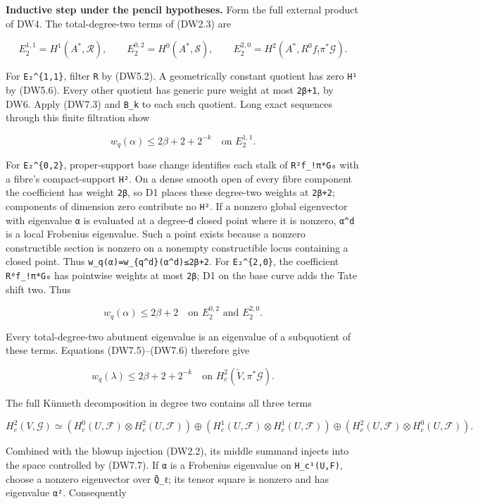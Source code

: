 \documentclass[
]{report}
\newcounter{none} %
\begin{document}
\textbf{Inductive step under the pencil hypotheses.} Form the full
external product of DW4. The total-degree-two terms of (DW2.3) are

\[
E_2^{1,1}=H^1(A^*,\mathcal R),\qquad
E_2^{0,2}=H^0(A^*,\mathcal S),\qquad
E_2^{2,0}=H^2(A^*,R^0f_!\pi^*\mathcal G).
\tag{DW7.4}
\]

For \texttt{E₂\^{}\{1,1\}}, filter \texttt{R} by (DW5.2). A
geometrically constant quotient has zero \texttt{H¹} by (DW5.6). Every
other quotient has generic pure weight at most \texttt{2β+1}, by DW6.
Apply (DW7.3) and \texttt{B\_k} to each such quotient. Long exact
sequences through this finite filtration show

\[
w_q(\alpha)\le2\beta+2+2^{-k}
\quad\text{on }E_2^{1,1}.
\tag{DW7.5}
\]

For \texttt{E₂\^{}\{0,2\}}, proper-support base change identifies each
stalk of \texttt{R²f\_!π*G₀} with a fibre's compact-support \texttt{H²}.
On a dense smooth open of every fibre component the coefficient has
weight \texttt{2β}, so D1 places these degree-two weights at
\texttt{2β+2}; components of dimension zero contribute no \texttt{H²}.
If a nonzero global eigenvector with eigenvalue \texttt{α} is evaluated
at a degree-\texttt{d} closed point where it is nonzero, \texttt{α\^{}d}
is a local Frobenius eigenvalue. Such a point exists because a nonzero
constructible section is nonzero on a nonempty constructible locus
containing a closed point. Thus
\texttt{w\_q(α)=w\_\{q\^{}d\}(α\^{}d)≤2β+2}. For \texttt{E₂\^{}\{2,0\}},
the coefficient \texttt{R⁰f\_!π*G₀} has pointwise weights at most
\texttt{2β}; D1 on the base curve adds the Tate shift two. Thus

\[
w_q(\alpha)\le2\beta+2
\quad\text{on }E_2^{0,2}\text{ and }E_2^{2,0}.
\tag{DW7.6}
\]

Every total-degree-two abutment eigenvalue is an eigenvalue of a
subquotient of these terms. Equations (DW7.5)--(DW7.6) therefore give

\[
w_q(\lambda)\le2\beta+2+2^{-k}
\quad\text{on }H_c^2(\widetilde V,\pi^*\mathcal G).
\tag{DW7.7}
\]

The full Künneth decomposition in degree two contains all three terms

\[
H_c^2(V,\mathcal G)
\simeq
(H_c^0(U,\mathcal F)\otimes H_c^2(U,\mathcal F))
\oplus
(H_c^1(U,\mathcal F)\otimes H_c^1(U,\mathcal F))
\oplus
(H_c^2(U,\mathcal F)\otimes H_c^0(U,\mathcal F)).
\tag{DW7.8}
\]

Combined with the blowup injection (DW2.2), its middle summand injects
into the space controlled by (DW7.7). If \texttt{α} is a Frobenius
eigenvalue on \texttt{H\_c¹(U,F)}, choose a nonzero eigenvector over
\texttt{Q̄\_ℓ}; its tensor square is nonzero and has eigenvalue
\texttt{α²}. Consequently
\end{document}
